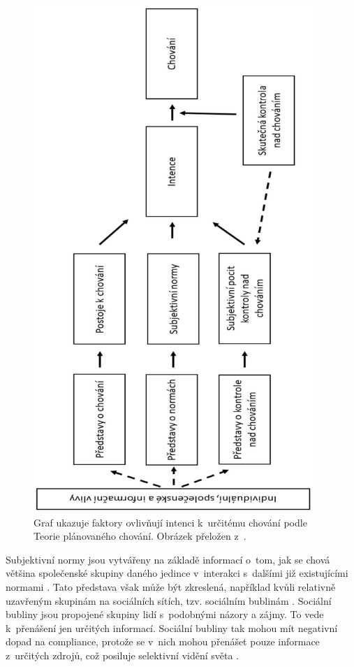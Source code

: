 \begin{figure}
\begin{center}
    \includegraphics[angle=270,width=300pt]{./pic/Ajzen2-cs.eps}
    
    \caption{Graf ukazuje faktory ovlivňují intenci k~určitému chování podle Teorie plánovaného chování. Obrázek přeložen z~\cite{Ajzen2018}.}
    \label{fig:graph}
\end{center}
\end{figure}

Subjektivní normy jsou vytvářeny na základě informací o~tom, jak se chová většina společenské skupiny daného jedince v~interakci s~dalšími již existujícími normami \cite{Ajzen1991}. Tato představa však může být zkreslená, například kvůli relativně uzavřeným skupinám na sociálních sítích, tzv. sociálním bublinám \cite{Gonzalez-Padilla2020}. Sociální bubliny jsou propojené skupiny lidí s~podobnými názory a zájmy. To vede k~přenášení jen určitých informací. Sociální bubliny tak mohou mít negativní dopad na compliance, protože se v~nich mohou přenášet pouze informace z~určitých zdrojů, což posiluje selektivní vidění světa \cite{Gonzalez-Padilla2020,Pariser2012TheFB}. 

